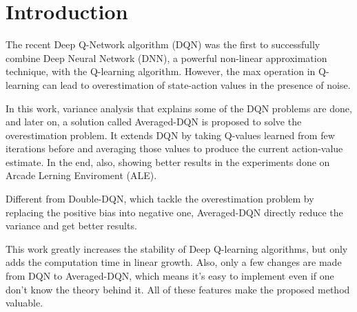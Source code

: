\section{Introduction}
\label{section:intro}

The recent Deep Q-Network algorithm (DQN) was the first to successfully combine Deep Neural Network (DNN), a powerful non-linear approximation technique, with the Q-learning algorithm. However, the max operation in Q-learning can lead to overestimation of state-action values in the presence of noise.
\par In this work, variance analysis that explains some of the DQN problems are done, and later on, a solution called Averaged-DQN is proposed to solve the overestimation problem. It extends DQN by taking Q-values learned from few iterations before and averaging those values to produce the current action-value estimate. In the end, also, showing better results in the experiments done on Arcade Lerning Enviroment (ALE).
\par Different from Double-DQN, which tackle the overestimation problem by replacing the positive bias into negative one, Averaged-DQN directly reduce the variance and get better results.
\par This work greatly increases the stability of Deep Q-learning algorithms, but only adds the computation time in linear growth. Also, only a few changes are made from DQN to Averaged-DQN, which means it's easy to implement even if one don't know the theory behind it. All of these features make the proposed method valuable.

\iffalse
Please provide a clear overview of the selected paper. You may want to discuss the following aspects:
\begin{itemize}
    \item The main research challenges tackled by the paper
    \item The high-level technical insights into the problem of interest
    \item The main contributions of the paper (compared to the prior works)
    \item Your personal perspective on the proposed method
\end{itemize}
\fi